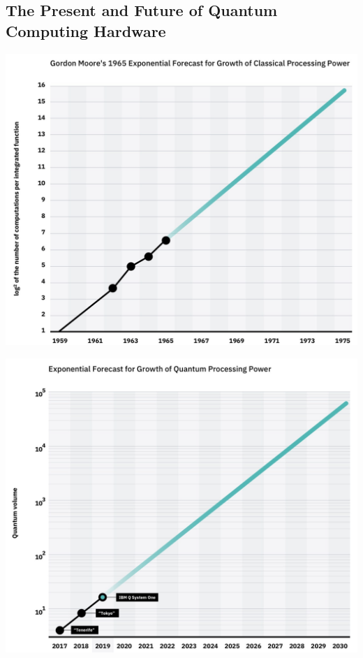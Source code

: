 \documentclass[a0,portrait]{a0poster}
\begin{document}
\begin{multicols}{2}
\color{DarkSlateGray} %

\section*{The Present and Future of Quantum Computing Hardware}
\begin{minipage}[c]{0.45\linewidth}%
	\includegraphics[width=\linewidth]{MooresLaw}\\%
\end{minipage}%
\begin{minipage}[c]{0.45\linewidth}%
	\includegraphics[width=\linewidth]{Qvolume}\\%
\end{minipage}%


\end{multicols}
\end{document}

